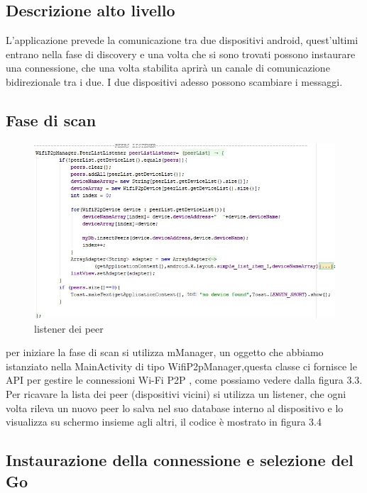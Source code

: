 \subsection{Descrizione alto livello}


L'applicazione prevede la comunicazione tra due dispositivi android,
quest'ultimi entrano nella fase di discovery e una volta che si sono trovati
possono instaurare una connessione,
che una volta stabilita aprirà un canale di comunicazione bidirezionale tra i due.
I due dispositivi adesso possono scambiare i messaggi.


\subsection{Fase di scan}
\begin{figure}
   \caption{listener dei peer}
   \centering
   \includegraphics[width=1\columnwidth]{imgs/peerListener.png}%
\end{figure}


per iniziare la fase di scan si utilizza mManager, un
oggetto che abbiamo istanziato nella MainActivity
di tipo WifiP2pManager,questa classe ci fornisce le API per gestire le connessioni
Wi-Fi P2P \cite{androiddevelopers},
come possiamo vedere dalla figura 3.3.
Per ricavare la lista dei peer (dispositivi vicini)
si utilizza un listener,
che ogni volta rileva un nuovo peer lo salva nel suo database
interno al dispositivo e lo
visualizza su schermo insieme agli altri, il codice è mostrato
in figura 3.4


\subsection{Instaurazione della connessione e selezione del Go}



